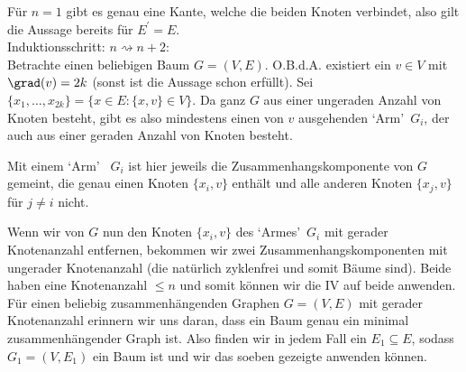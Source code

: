 \begin{solution}
Für $n = 1$ gibt es genau eine Kante, welche die beiden Knoten verbindet,
also gilt die Aussage bereits für $E^{\prime} = E$. \\

Induktionsschritt: $n \rightsquigarrow n + 2$: \\
Betrachte einen beliebigen Baum $G = (V,E)$.
O.B.d.A. existiert ein $v \in V$ mit $\grad(v) = 2k$ (sonst ist die Aussage schon erfüllt). Sei $\{x_1,\dots,x_{2k}\} = \{x \in E: \{x,v \} \in V\}$.
Da ganz $G$ aus einer ungeraden Anzahl von Knoten besteht, gibt es also mindestens einen von $v$ ausgehenden \textquoteleft{Arm}\textquoteright ~$G_i$, der auch aus einer geraden Anzahl von Knoten besteht.

Mit einem \textquoteleft{Arm}\textquoteright ~ $G_i$ ist hier jeweils die Zusammenhangskomponente von $G$ gemeint, die genau einen Knoten $\{x_i,v\}$ enthält und alle anderen Knoten $\{x_j,v\}$ für $j \neq i$ nicht.

Wenn wir von $G$ nun den Knoten $\{x_i,v\}$ des \textquoteleft{Armes}\textquoteright ~$G_i$ mit gerader Knotenanzahl entfernen, bekommen wir zwei Zusammenhangskomponenten mit ungerader Knotenanzahl (die natürlich zyklenfrei und somit Bäume sind). Beide haben eine Knotenanzahl $\leq n$ und somit können wir die IV auf beide anwenden. \\


Für einen beliebig zusammenhängenden Graphen $G = (V,E)$ mit gerader Knotenanzahl
erinnern wir uns daran, dass
ein Baum genau ein minimal zusammenhängender Graph ist.
Also finden wir in jedem Fall ein $E_1 \subseteq E$, sodass $G_1 = (V,E_1)$
ein Baum ist und wir das soeben gezeigte anwenden können.

\end{solution}

